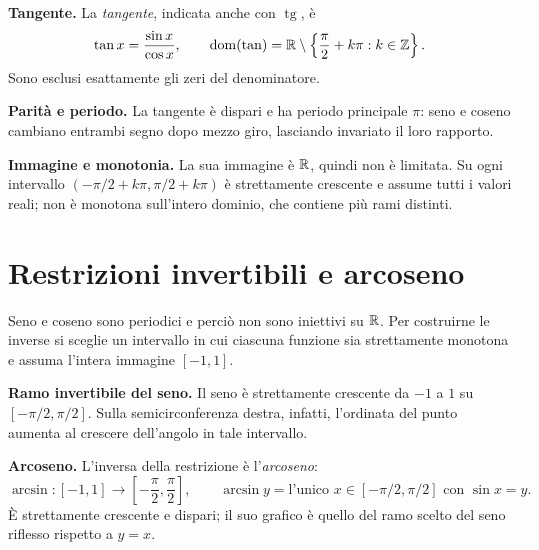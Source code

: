 \textbf{Tangente.} La \emph{tangente}, indicata anche con $\operatorname{tg}$, è
\[
\tan x=\frac{\sin x}{\cos x},\qquad
\operatorname{dom}(\tan)=\mathbb{R}\setminus
\left\{\frac\pi2+k\pi:k\in\mathbb{Z}\right\}.
\]
Sono esclusi esattamente gli zeri del denominatore.

\textbf{Parità e periodo.} La tangente è dispari e ha periodo principale $\pi$: seno e coseno cambiano entrambi segno dopo mezzo giro, lasciando invariato il loro rapporto.

\textbf{Immagine e monotonia.} La sua immagine è $\mathbb{R}$, quindi non è limitata. Su ogni intervallo $(-\pi/2+k\pi,\pi/2+k\pi)$ è strettamente crescente e assume tutti i valori reali; non è monotona sull'intero dominio, che contiene più rami distinti.

\section{Restrizioni invertibili e arcoseno}

Seno e coseno sono periodici e perciò non sono iniettivi su $\mathbb{R}$. Per costruirne le inverse si sceglie un intervallo in cui ciascuna funzione sia strettamente monotona e assuma l'intera immagine $[-1,1]$.

\textbf{Ramo invertibile del seno.} Il seno è strettamente crescente da $-1$ a $1$ su $[-\pi/2,\pi/2]$. Sulla semicirconferenza destra, infatti, l'ordinata del punto aumenta al crescere dell'angolo in tale intervallo.

\textbf{Arcoseno.} L'inversa della restrizione è l'\emph{arcoseno}:
\[
\arcsin\colon[-1,1]\longrightarrow
\left[-\frac\pi2,\frac\pi2\right],
\qquad \arcsin y=\text{l'unico }x\in[-\pi/2,\pi/2]\text{ con }\sin x=y.
\]
È strettamente crescente e dispari; il suo grafico è quello del ramo scelto del seno riflesso rispetto a $y=x$.

